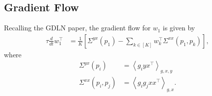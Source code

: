 \documentclass{article}
\begin{document}
\subsection{Gradient Flow}
Recalling the GDLN paper, the gradient flow for $w_1$ is given by
\begin{align}
  \tau \frac{d}{dt} w_1^\top &= \frac{1}{K} \left[ \Sigma^{yx}(p_1) - \sum_{k \in [K]} w_k^\top \Sigma^{xx}(p_1,p_k) \right], \label{eq:grad_flow}
\end{align}
where
\begin{align}
  \Sigma^{yx}(p_i) &= \left\langle g_i y x^\top \right\rangle_{g,x,y} \\
  \Sigma^{xx}(p_i,p_j) &= \left\langle g_i g_j x x^\top \right\rangle_{g,x}.
\end{align}

\end{document}
